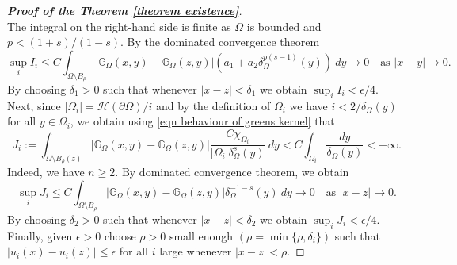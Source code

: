\documentclass{amsart}
\newcommand{\gk}[1]{\mathbb{G}_{#1}}
\begin{document}
\begin{proof}[\textbf{Proof of the Theorem \ref{theorem existence}}]
\begin{equation*}
\end{equation*}
 The integral on the right-hand side is finite as $\Omega$ is bounded and $p<(1+s)/(1-s)$. By the dominated convergence theorem
 \begin{equation*}
   \sup_{i} I_{i}\leq C\int_{\Omega\setminus B_{\rho}} |\gk{\Omega}(x,y)-\gk{\Omega}(z,y)|(a_{1}+a_{2}\delta_{\Omega}^{p(s-1)}(y))\ dy\to 0 \quad\text{as }|x-y|\to 0.
 \end{equation*}
 By choosing $\delta_{1}>0$ such that whenever $|x-z|<\delta_1$ we obtain $\sup_{i} I_{i}<\epsilon/4$. Next, since $|\Omega_{i}|=\mathcal{H}(\partial\Omega)/i$ and by the definition of $\Omega_{i}$ we have $i<2/\delta_{\Omega}(y)$ for all $y\in \Omega_{i}$, we obtain using \eqref{eqn behaviour of greens kernel} that
 \begin{equation*}
    J_{i}:= \int_{\Omega\setminus B_{\rho}(z)}|\gk{\Omega}(x,y)-\gk{\Omega}(z,y)|\frac{C\chi_{\Omega_{i}}}{|\Omega_{i}|\delta_{\Omega}^{s}(y)}\ dy< C\int_{\Omega_{i}} \frac{dy}{\delta_{\Omega}(y)}<+\infty.
 \end{equation*}
 Indeed, we have $n\geq 2$. By dominated convergence theorem, we obtain
 \begin{equation*}
     \sup_{i}J_{i}\leq C\int_{\Omega\setminus B_{\rho}} |\gk{\Omega}(x,y)-\gk{\Omega}(z,y)| \delta_{\Omega}^{-1-s}(y)\ dy\to 0\quad \text{as } |x-z|\to 0.
 \end{equation*}
By choosing $\delta_{2}>0$ such that whenever $|x-z|<\delta_2$ we obtain $\sup_{i} J_{i}<\epsilon/4$.
 Finally, given $\epsilon>0$ choose $\rho>0$ small enough $(\rho=\min\{\rho,\delta_{i}\})$ such that $|u_{i}(x)-u_{i}(z)|\leq \epsilon$ for all $i$ large whenever $|x-z|<\rho$.



\end{proof}
\end{document}
